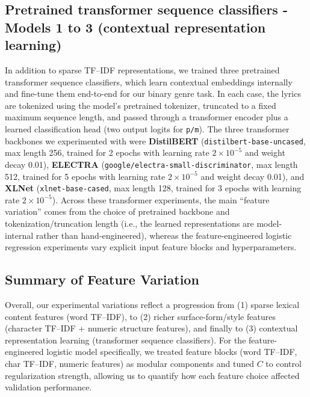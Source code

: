 \subsection{Pretrained transformer sequence classifiers - Models 1 to 3 (contextual representation learning)}
In addition to sparse TF--IDF representations, we trained three pretrained transformer sequence classifiers, which learn contextual embeddings internally and fine-tune them end-to-end for our binary genre task. In each case, the lyrics are tokenized using the model’s pretrained tokenizer, truncated to a fixed maximum sequence length, and passed through a transformer encoder plus a learned classification head (two output logits for \texttt{p/m}). The three transformer backbones we experimented with were \textbf{DistilBERT} (\texttt{distilbert-base-uncased}, max length 256, trained for 2 epochs with learning rate $2\times10^{-5}$ and weight decay 0.01),  \textbf{ELECTRA} (\texttt{google/electra-small-discriminator}, max length 512, trained for 5 epochs with learning rate $2\times10^{-5}$ and weight decay 0.01), and \textbf{XLNet} (\texttt{xlnet-base-cased}, max length 128, trained for 3 epochs with learning rate $2\times10^{-5}$). Across these transformer experiments, the main ``feature variation'' comes from the choice of pretrained backbone and tokenization/truncation length (i.e., the learned representations are model-internal rather than hand-engineered), whereas the feature-engineered logistic regression experiments vary explicit input feature blocks and hyperparameters.

\subsection{Summary of Feature Variation}
Overall, our experimental variations reflect a progression from (1) sparse lexical content features (word TF--IDF), to (2) richer surface-form/style features (character TF--IDF + numeric structure features), and finally to (3) contextual representation learning (transformer sequence classifiers). For the feature-engineered logistic model specifically, we treated feature blocks (word TF--IDF, char TF--IDF, numeric features) as modular components and tuned $C$ to control regularization strength, allowing us to quantify how each feature choice affected validation performance. 